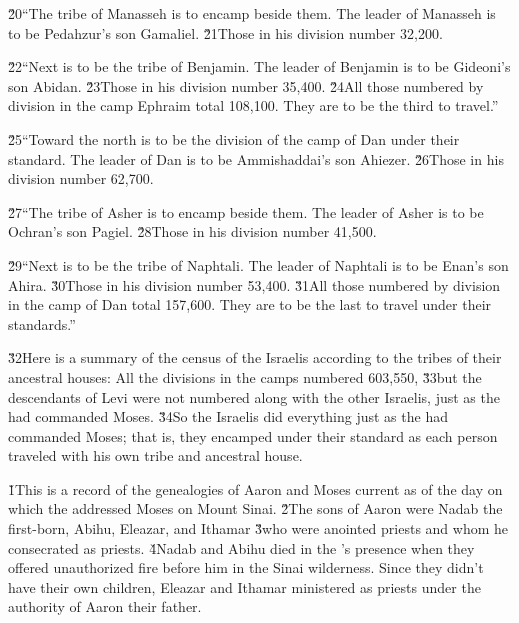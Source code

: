 \v{20}``The tribe of Manasseh is to encamp beside them. The leader of Manasseh is to be Pedahzur's son Gamaliel. \v{21}Those in his division number 32,200.

\v{22}``Next is to be the tribe of Benjamin. The leader of Benjamin is to be Gideoni's son Abidan. \v{23}Those in his division number 35,400. \v{24}All those numbered by division in the camp Ephraim total 108,100. They are to be the third to travel.''

\v{25}``Toward the north is to be the division of the camp of Dan under their standard. The leader of Dan is to be Ammishaddai's son Ahiezer. \v{26}Those in his division number 62,700.

\v{27}``The tribe of Asher is to encamp beside them. The leader of Asher is to be Ochran's son Pagiel. \v{28}Those in his division number 41,500.

\v{29}``Next is to be the tribe of Naphtali. The leader of Naphtali is to be Enan's son Ahira. \v{30}Those in his division number 53,400. \v{31}All those numbered by division in the camp of Dan total 157,600. They are to be the last to travel under their standards.''

\v{32}Here is a summary of the census of the Israelis according to the tribes of their ancestral houses: All the divisions in the camps numbered 603,550, \v{33}but the descendants of Levi were not numbered along with the other Israelis, just as the  had commanded Moses. \v{34}So the Israelis did everything just as the  had commanded Moses; that is, they encamped under their standard as each person traveled with his own tribe and ancestral house.

\v{1}This is a record of the genealogies of Aaron and Moses current as of the day on which the  addressed Moses on Mount Sinai. \v{2}The sons of Aaron were Nadab the first-born, Abihu, Eleazar, and Ithamar \v{3}who were anointed priests and whom he consecrated as priests. \v{4}Nadab and Abihu died in the 's presence when they offered unauthorized fire before him in the Sinai wilderness. Since they didn't have their own children, Eleazar and Ithamar ministered as priests under the authority of Aaron their father.


